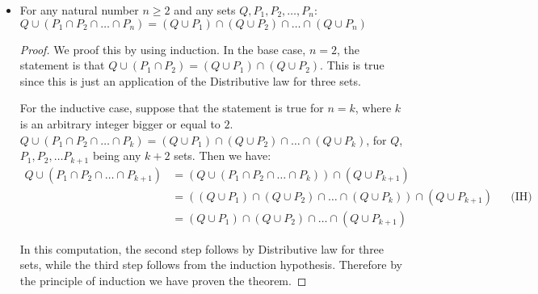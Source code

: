 \begin{solutions}
\begin{itemize}
\begin{proof}
			In this computation, the second step follows by Distributive law for three sets, while the third step follows from the induction hypothesis. Therefore by the principle of induction we have proven the theorem.
		\end{proof}
		\item For any natural number $n\geq 2$ and any sets $Q, P_1, P_2,\ldots, P_n$: $Q\cup (P_1\cap P_2\cap \ldots \cap P_n)=(Q\cup P_1)\cap (Q\cup P_2)\cap\ldots\cap (Q\cup P_n)$\begin{proof}
		We proof this by using induction. In the base case, $n=2$, the statement is that $Q\cup (P_1\cap P_2)=(Q\cup P_1)\cap (Q\cup P_2)$. This is true since this is just an application of the Distributive law for three sets.

		For the inductive case, suppose that the statement is true for $n=k$, where $k$ is an arbitrary integer bigger or equal to $2$. $Q\cup (P_1\cap P_2\cap \ldots \cap P_k)=(Q\cup P_1)\cap (Q\cup P_2)\cap\ldots\cap (Q\cup P_k)$, for $Q$, $P_1, P_2,\ldots P_{k+1}$ being any $k+2$ sets. Then we have:
		\begin{align*}
		Q\cup (P_1\cap P_2\cap \ldots \cap P_{k+1})&=(Q\cup (P_1\cap P_2\cap \ldots\cap P_k))\cap (Q\cup P_{k+1})\\
		&=((Q\cup P_1)\cap (Q\cup P_2)\cap\ldots\cap (Q\cup P_k))\cap (Q\cup P_{k+1})&&\text{(IH)}\\
		&=(Q\cup P_1)\cap (Q\cup P_2)\cap\ldots\cap (Q\cup P_{k+1})
		\end{align*}

		In this computation, the second step follows by Distributive law for three sets, while the third step follows from the induction hypothesis. Therefore by the principle of induction we have proven the theorem.
	\end{proof}
	\end{itemize}
\end{solutions}

